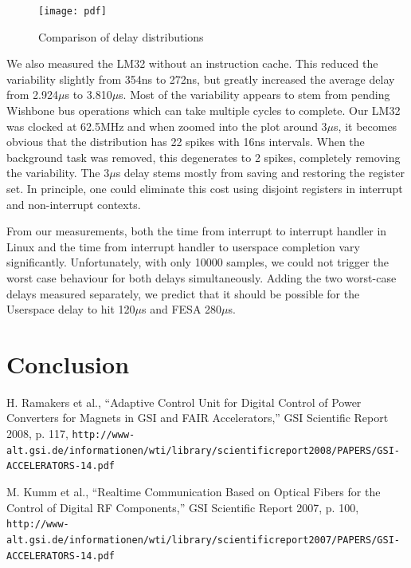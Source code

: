 \documentclass{JAC2003}
\begin{document}
\begin{figure}[t]
   \centering
   \texttt{[image: pdf]}
   \caption{Comparison of delay distributions}
\end{figure}

We also measured the LM32 without an instruction cache.
This reduced the variability slightly from 354ns to 272ns, 
but greatly increased the average delay from 2.924$\mu$s to 3.810$\mu$s.
Most of the variability appears to stem from pending Wishbone bus operations which
can take multiple cycles to complete.
Our LM32 was clocked at 62.5MHz and when zoomed into the plot around 3$\mu$s,
it becomes obvious that the distribution has 22 spikes with 16ns intervals.
When the background task was removed, 
this degenerates to 2 spikes, 
completely removing the variability.
The 3$\mu$s delay stems mostly from saving and restoring the register set.
In principle, one could eliminate this cost using disjoint registers 
in interrupt and non-interrupt contexts.

From our measurements,
both the time from interrupt to interrupt handler in Linux 
and the time from interrupt handler to userspace completion vary significantly.
Unfortunately, with only 10000 samples, 
we could not trigger the worst case behaviour for both delays simultaneously.
Adding the two worst-case delays measured separately,
we predict that it should be possible for the Userspace delay to hit
120$\mu$s and FESA 280$\mu$s.

\section{Conclusion}

\begin{thebibliography}{9}   %


H. Ramakers  et al., ``Adaptive Control Unit for Digital Control of Power Converters for Magnets in GSI and FAIR Accelerators,'' GSI Scientific Report 2008, p. 117,
\texttt{http://www-alt.gsi.de/informationen/wti/library/scientificreport2008/PAPERS/GSI-ACCELERATORS-14.pdf}

M. Kumm  et al., ``Realtime Communication Based on Optical Fibers for the Control of Digital RF Components,'' GSI Scientific Report 2007, p. 100,
\texttt{http://www-alt.gsi.de/informationen/wti/library/scientificreport2007/PAPERS/GSI-ACCELERATORS-14.pdf}




\end{thebibliography}
\end{document}
